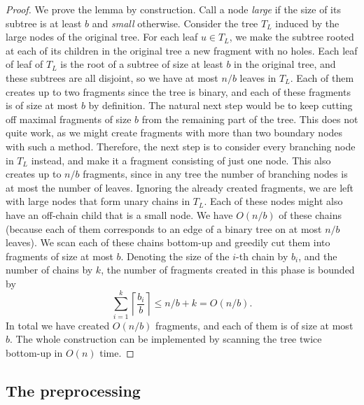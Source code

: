 \documentclass[11pt,a4paper]{article}
\theoremstyle{definition}
\theoremstyle{remark}
\begin{document}
\begin{proof}
We prove the lemma by construction. Call a node \textit{large} if the size of its subtree is at least $b$
and \textit{small} otherwise. Consider the tree $T_L$ induced by the large nodes of the original tree. 
For each leaf $u\in T_{L}$, we make the subtree rooted at each of its children in the original tree a new fragment with no holes.
Each leaf of leaf of $T_{L}$ is the root of a subtree of size at least $b$ in the original tree, and these subtrees
are all disjoint, so we have at most $n/b$ leaves in $T_{L}$. Each of them creates up to two fragments
since the tree is binary, and each of these fragments is of size at most $b$ by definition.
The natural next step would be to keep cutting off maximal fragments of size $b$ from the remaining
part of the tree. This does not quite work, as we might create fragments with more than two boundary
nodes with such a method.
Therefore, the next step is to consider every branching node in $T_{L}$ instead, and make it a fragment
consisting of just one node. This also creates up to $n/b$ fragments, since in any tree the number of
branching nodes is at most the number of leaves.
Ignoring the already created fragments, we are left with large nodes that form unary chains in $T_{L}$.
Each of these nodes might also have an off-chain child that is a small node. We have $O(n/b)$ of these chains
(because each of them corresponds to an edge of a binary tree on at most $n/b$ leaves).
We scan each of these chains bottom-up and greedily cut them into fragments of size at most $b$.
Denoting the size of the $i$-th chain by $b_{i}$, and the number of chains by $k$, the number of fragments created in this phase is
bounded by $$\sum_{i=1}^{k} \left\lceil \frac{b_i}{b} \right\rceil \leq n/b+k=O(n/b).$$
In total we have created $O(n/b)$ fragments, and each of them is of size at most $b$.
The whole construction can be implemented by scanning the tree twice bottom-up in $O(n)$ time.
\end{proof}


\subsection{The preprocessing} \label{Pre-Processing Fragments}
\end{document}
